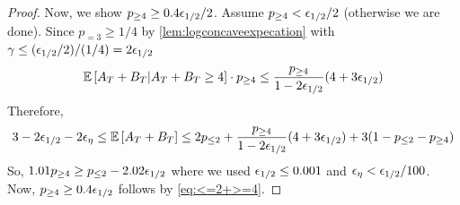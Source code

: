 \begin{proof}
Now, we show $p_{\geq 4} \geq 0.4 {\epsilon}_{1/2}/2$. 
Assume $p_{\geq 4}<{\epsilon}_{1/2}/2$ (otherwise we are done).
Since $p_{=3}\geq 1/4$ by \cref{lem:logconcaveexpecation} with $\gamma\le  ({\epsilon}_{1/2}/2)/(1/4) = 2{\epsilon}_{1/2}$
$${\mathbb{E}}\left[A_T+B_T | A_T+B_T\geq 4\right]\cdot p_{\geq 4} \leq \frac{p_{\geq 4}}{1-2{\epsilon}_{1/2}}(4+3{\epsilon}_{1/2})$$
Therefore,
$$ 3-2{\epsilon}_{1/2}-2{\epsilon}_\eta\leq {\mathbb{E}}\left[A_T+B_T\right] \leq 2p_{\leq 2} +  \frac{p_{\geq 4}}{1-2{\epsilon}_{1/2}}(4+3{\epsilon}_{1/2}) + 3(1-p_{\leq 2}-p_{\geq 4})$$
So, $1.01p_{\geq 4}\geq p_{\leq 2}-2.02{\epsilon}_{1/2}$ where we used ${\epsilon}_{1/2}\leq 0.001$ and ${\epsilon}_{\eta}<{\epsilon}_{1/2}/100$.  Now, $p_{\geq 4}\geq 0.4{\epsilon}_{1/2}$ follows by \cref{eq:<=2+>=4}.
\end{proof}


%


